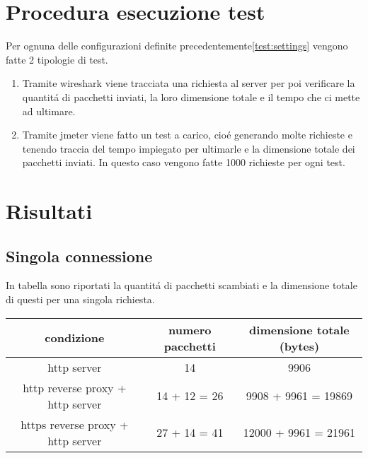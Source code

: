 \section{Procedura esecuzione test}
Per ognuna delle configurazioni definite precedentemente\ref{test:settings} vengono fatte 2 tipologie di test.
\begin{enumerate}
  \item Tramite wireshark viene tracciata una richiesta al server per poi verificare la quantitá di pacchetti inviati, la loro dimensione totale e il tempo che ci mette ad ultimare.
  \item Tramite jmeter viene fatto un test a carico, cioé generando molte richieste e tenendo traccia del tempo impiegato per ultimarle e la dimensione totale dei pacchetti inviati. In questo caso vengono fatte 1000 richieste per ogni test.

\end{enumerate}

\section{Risultati}
\subsection{Singola connessione}
In tabella sono riportati la quantitá di pacchetti scambiati e la dimensione totale di questi per una singola richiesta.
\begin{center}
  \begin{tabular}{|c|c|c|}
    \hline
    condizione & numero pacchetti & dimensione totale (bytes) \\
    \hline
    \hline
    http server & 14 & 9906 \\
    \hline
    http reverse proxy + http server & 14 + 12 = 26 & 9908 + 9961 = 19869 \\
    \hline
    https reverse proxy + http server & 27 + 14 = 41 & 12000 + 9961 = 21961 \\
    \hline

  \end{tabular}
\end{center}

